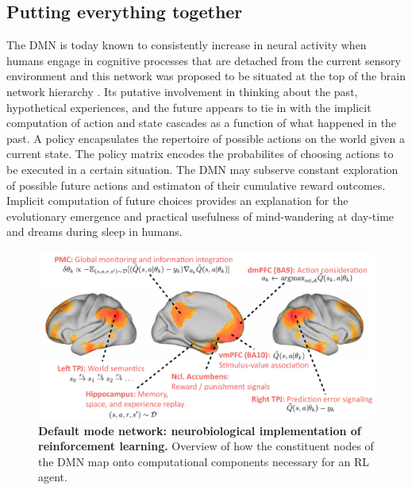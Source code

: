 \documentclass[10pt,letterpaper]{article}
\begin{document}
\subsection{Putting everything together}
The DMN is today known to consistently increase in neural
  activity when humans engage in cognitive processes that are detached from
  the current sensory environment
  and this network was proposed to be situated
  at the top of the brain network hierarchy
  \citep{carhart2010default, margulies2016situating}.
  Its putative involvement in thinking about the past,
  hypothetical experiences, and the future
  appears to tie in with the implicit computation of
  action and state cascades as a function of what happened in the past.
  A policy encapsulates the repertoire of possible actions
    on the world given a current state.
    The policy matrix encodes the probabilites of
    choosing actions to be executed in a certain situation.
The DMN may subserve
  constant exploration of possible future actions and estimaton of their
  cumulative reward outcomes. Implicit computation of future choices
  provides an explanation for the
  evolutionary emergence and practical usefulness of
  mind-wandering at day-time and dreams during sleep
  in humans.
\begin{figure}[!h]
  \includegraphics[width=.9\linewidth]{neurobiological_and_rl_overview_DMN.pdf}
  \caption{\textbf{Default mode network:
  neurobiological implementation of reinforcement learning.}
  Overview of how the constituent nodes of the DMN
  map onto computational components necessary for an RL agent.}
  \label{fig:rl_process_chart}
\end{figure}
\end{document}
